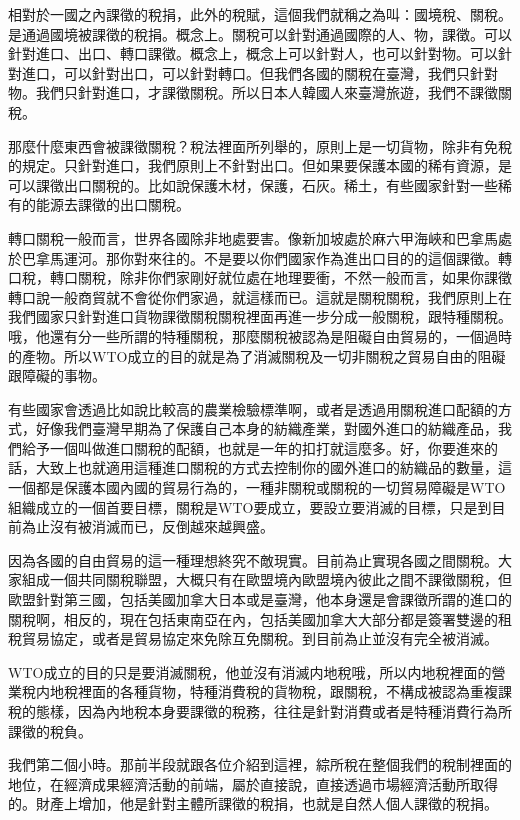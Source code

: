 \documentclass[]{ctexbook}
\begin{document}
相對於一國之內課徵的稅捐，此外的稅賦，這個我們就稱之為叫：國境稅、關稅。是通過國境被課徵的稅捐。概念上。關稅可以針對通過國際的人、物，課徵。可以針對進口、出口、轉口課徵。概念上，概念上可以針對人，也可以針對物。可以針對進口，可以針對出口，可以針對轉口。但我們各國的關稅在臺灣，我們只針對物。我們只針對進口，才課徵關稅。所以日本人韓國人來臺灣旅遊，我們不課徵關稅。

那麼什麼東西會被課徵關稅？稅法裡面所列舉的，原則上是一切貨物，除非有免稅的規定。只針對進口，我們原則上不針對出口。但如果要保護本國的稀有資源，是可以課徵出口關稅的。比如說保護木材，保護，石灰。稀土，有些國家針對一些稀有的能源去課徵的出口關稅。

轉口關稅一般而言，世界各國除非地處要害。像新加坡處於麻六甲海峽和巴拿馬處於巴拿馬運河。那你對來往的。不是要以你們國家作為進出口目的的這個課徵。轉口稅，轉口關稅，除非你們家剛好就位處在地理要衝，不然一般而言，如果你課徵轉口說一般商貿就不會從你們家過，就這樣而已。這就是關稅關稅，我們原則上在我們國家只針對進口貨物課徵關稅關稅裡面再進一步分成一般關稅，跟特種關稅。哦，他還有分一些所謂的特種關稅，那麼關稅被認為是阻礙自由貿易的，一個過時的產物。所以WTO成立的目的就是為了消滅關稅及一切非關稅之貿易自由的阻礙跟障礙的事物。

有些國家會透過比如說比較高的農業檢驗標準啊，或者是透過用關稅進口配額的方式，好像我們臺灣早期為了保護自己本身的紡織產業，對國外進口的紡織產品，我們給予一個叫做進口關稅的配額，也就是一年的扣打就這麼多。好，你要進來的話，大致上也就適用這種進口關稅的方式去控制你的國外進口的紡織品的數量，這一個都是保護本國內國的貿易行為的，一種非關稅或關稅的一切貿易障礙是WTO組織成立的一個首要目標，關稅是WTO要成立，要設立要消滅的目標，只是到目前為止沒有被消滅而已，反倒越來越興盛。

因為各國的自由貿易的這一種理想終究不敵現實。目前為止實現各國之間關稅。大家組成一個共同關稅聯盟，大概只有在歐盟境內歐盟境內彼此之間不課徵關稅，但歐盟針對第三國，包括美國加拿大日本或是臺灣，他本身還是會課徵所謂的進口的關稅啊，相反的，現在包括東南亞在內，包括美國加拿大大部分都是簽署雙邊的租稅貿易協定，或者是貿易協定來免除互免關稅。到目前為止並沒有完全被消滅。

WTO成立的目的只是要消滅關稅，他並沒有消滅内地稅哦，所以内地稅裡面的營業稅内地稅裡面的各種貨物，特種消費稅的貨物稅，跟關稅，不構成被認為重複課稅的態樣，因為內地稅本身要課徵的稅務，往往是針對消費或者是特種消費行為所課徵的稅負。

我們第二個小時。那前半段就跟各位介紹到這裡，綜所稅在整個我們的稅制裡面的地位，在經濟成果經濟活動的前端，屬於直接說，直接透過市場經濟活動所取得的。財產上增加，他是針對主體所課徵的稅捐，也就是自然人個人課徵的稅捐。
\end{document}
